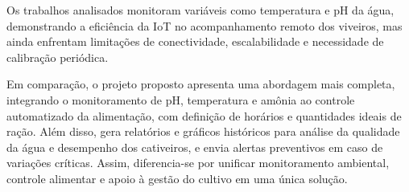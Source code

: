 Os trabalhos analisados monitoram variáveis como temperatura e pH da água, demonstrando a eficiência da IoT no acompanhamento remoto dos viveiros, mas ainda enfrentam limitações de conectividade, escalabilidade e necessidade de calibração periódica.

Em comparação, o projeto proposto apresenta uma abordagem mais completa, integrando o monitoramento de pH, temperatura e amônia ao controle automatizado da alimentação, com definição de horários e quantidades ideais de ração. Além disso, gera relatórios e gráficos históricos para análise da qualidade da água e desempenho dos cativeiros, e envia alertas preventivos em caso de variações críticas. Assim, diferencia-se por unificar monitoramento ambiental, controle alimentar e apoio à gestão do cultivo em uma única solução.